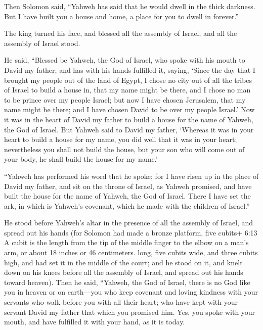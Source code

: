  Then Solomon said, ``Yahweh has said that he would dwell in
the thick darkness.  But I have built you a house and home,
a place for you to dwell in forever.''

 The king turned his face, and blessed all the assembly of
Israel; and all the assembly of Israel stood.

 He said, ``Blessed be Yahweh, the God of Israel, who spoke
with his mouth to David my father, and has with his hands fulfilled it,
saying,  `Since the day that I brought my people out of the
land of Egypt, I chose no city out of all the tribes of Israel to build
a house in, that my name might be there, and I chose no man to be prince
over my people Israel;  but now I have chosen Jerusalem,
that my name might be there; and I have chosen David to be over my
people Israel.'  Now it was in the heart of David my father
to build a house for the name of Yahweh, the God of Israel. 
But Yahweh said to David my father, `Whereas it was in your heart to
build a house for my name, you did well that it was in your heart;
 nevertheless you shall not build the house, but your son
who will come out of your body, he shall build the house for my name.'

 ``Yahweh has performed his word that he spoke; for I have
risen up in the place of David my father, and sit on the throne of
Israel, as Yahweh promised, and have built the house for the name of
Yahweh, the God of Israel.  There I have set the ark, in
which is Yahweh's covenant, which he made with the children of Israel.''

 He stood before Yahweh's altar in the presence of all the
assembly of Israel, and spread out his hands  (for Solomon
had made a bronze platform, five cubits+ 6:13 A cubit is the length from
the tip of the middle finger to the elbow on a man's arm, or about 18
inches or 46 centimeters. long, five cubits wide, and three cubits high,
and had set it in the middle of the court; and he stood on it, and knelt
down on his knees before all the assembly of Israel, and spread out his
hands toward heaven).  Then he said, ``Yahweh, the God of
Israel, there is no God like you in heaven or on earth---you who keep
covenant and loving kindness with your servants who walk before you with
all their heart;  who have kept with your servant David my
father that which you promised him. Yes, you spoke with your mouth, and
have fulfilled it with your hand, as it is today.

